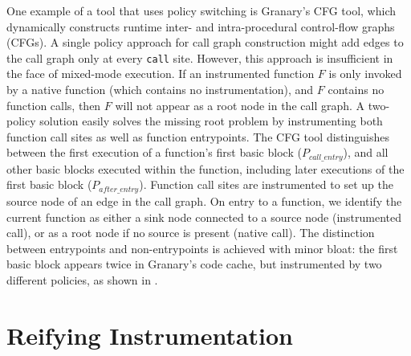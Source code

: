 \documentclass[preprint]{sigplanconf}
\begin{document}
One example of a tool that uses policy switching is Granary's CFG tool, which dynamically constructs runtime inter- and intra-procedural control-flow graphs (CFGs). A single policy approach for call graph construction might add edges to the call graph only at every \texttt{call} site. However, this approach is insufficient in the face of mixed-mode execution. If an instrumented function $F$ is only invoked by a native function (which contains no instrumentation), and $F$ contains no function calls, then $F$ will not appear as a root node in the call graph. A two-policy solution easily solves the missing root problem by instrumenting both function call sites as well as function entrypoints. The CFG tool distinguishes between the first execution of a function's first basic block ($P_{\mathit{call\_entry}}$), and all other basic blocks executed within the function, including later executions of the first basic block ($P_{\mathit{after\_entry}}$). Function call sites are instrumented to set up the source node of an edge in the call graph. On entry to a function, we identify the current function as either a sink node connected to a source node (instrumented call), or as a root node if no source is present (native call). The distinction between entrypoints and non-entrypoints is achieved with minor bloat: the first basic block appears twice in Granary's code cache, but instrumented by two different policies, as shown in .




\section{Reifying Instrumentation}\label{sec:reify}
\end{document}
